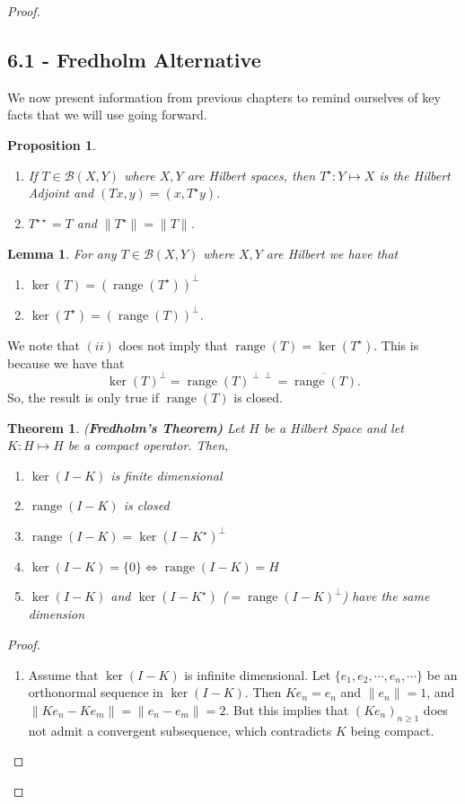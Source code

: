 \documentclass[oneside]{book}
\newtheorem{theorem}{Theorem}
\newtheorem{lemma}{Lemma}
\newtheorem{proposition}{Proposition}
\newcommand{\B}{\mathscr{B}}
\DeclareMathOperator{\range}{range}
\newcommand{\ov}{\overline}
\newcommand{\Ts}{T^{\star}}
\newcommand{\Ks}{K^{\star}}
\newcommand{\Tss}{T^{\star \star}}
\begin{document}
\begin{proof}
\subsection*{6.1 - Fredholm Alternative}
We now present information from previous chapters to remind ourselves of key facts that we will use going forward.
\begin{proposition}
\begin{enumerate}
\item[(1)] If $T \in \B(X, Y)$ where $X, Y$ are Hilbert spaces, then $\Ts: Y \mapsto X$ is the Hilbert Adjoint and $(Tx, y) = (x, \Ts y)$. 
\item[(2)] $\Tss = T$ and $\| \Ts \| = \| T \|$. 
\end{enumerate}
\end{proposition}
\begin{lemma}
For any $T \in \B(X, Y)$ where $X, Y$ are Hilbert we have that 
\begin{enumerate}
\item[(i)] $\ker(T) = \left( \range(\Ts) \right)^{\perp}$
\item[(ii)] $ \ker(\Ts) = \left( \range(T) \right)^{\perp}$.
\end{enumerate}
\end{lemma}
We note that $(ii)$ does not imply that $\range(T) = \ker(\Ts)$. This is because we have that
\[ \ker(T)^{\perp} = \range(T)^{\perp \perp} = \ov{\range(T)}. \]
So, the result is only true if $\range(T)$ is closed. 
\begin{theorem}(\textbf{Fredholm's Theorem)} Let $H$ be a Hilbert Space and let $K: H \mapsto H$ be a compact operator. Then, 
\begin{enumerate}
\item[(i)] $\ker(I - K)$ is finite dimensional
\item[(ii)] $\range(I - K)$ is closed
\item[(iii)] $\range(I - K) = \ker(I - \Ks)^{\perp}$
\item[(iv)] $\ker(I - K) = \{ 0 \} \Longleftrightarrow \range(I - K) = H$
\item[(v)] $\ker(I - K)$ and $\ker(I - \Ks)$ ($= \range(I - K)^{\perp}$) have the same dimension 
\end{enumerate}
\end{theorem}
\begin{proof}
\begin{enumerate}
\item[(i)] Assume that $\ker(I - K)$ is infinite dimensional. Let $\{ e_1, e_2, \cdots, e_n, \cdots \}$ be an orthonormal sequence in $\ker(I - K)$. Then $K e_n = e_n$ and $\| e_n \| = 1$, and $\| Ke_n - K e_m \| = \| e_n - e_m \| = 2$. But this implies that $(Ke_n)_{n \geq 1}$ does not admit a convergent subsequence, which contradicts $K$ being compact. 

\end{enumerate}
\end{proof}
\end{proof}
\end{document}
